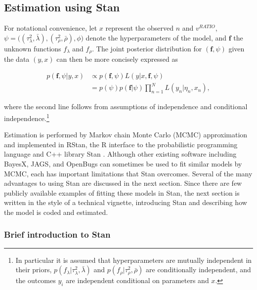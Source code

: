  \subsection{Estimation using Stan}

For notational convenience, let $x$ represent the observed $n$ and $v^{RATIO}$, 
$\psi = \big((\tau^2_\lambda, \bar{\lambda}), (\tau^2_\rho, \bar{\rho}), \phi \big)$ denote 
the hyperparameters of the model, and $\bm{f}$ the unknown functions  $f_\lambda$ and 
$f_\rho$. The joint posterior distribution for $(\bm{f}, \psi)$ given the data $(y, x)$ can then 
be more concisely expressed as 

\begin{align*}
p(\bm{f}, \psi | y, x) 
&\propto p(\bm{f}, \psi)  L(y | x, \bm{f}, \psi)  \\
&=p(\psi)  p(\bm{f} | \psi)   \prod_{n=1}^N L(y_n | \eta_n, x_n), 
\end{align*}

\noindent where the second line follows from assumptions of independence and conditional 
independence.\footnote{In particular it is assumed that hyperparameters are mutually independent 
in their priors, $p(f_\lambda | \tau^2_\lambda, \bar{\lambda})$ and $p(f_\rho | \tau^2_\rho, \bar{\rho})$ 
are conditionally independent, and the outcomes $y_i$ are independent conditional on parameters 
and $x$.}

Estimation is performed by Markov chain Monte Carlo (MCMC) approximation and implemented in 
RStan, the R interface to the probabilistic programming language and C++ library Stan 
. Although other existing software including BayesX, JAGS, and 
OpenBugs can sometimes be used to fit similar models by MCMC, each has important limitations 
that Stan overcomes. Several of the many advantages to using Stan are discussed in the next section. 
Since there are few publicly available examples of fitting these models in Stan, the next section is 
written in the style of a technical vignette, introducing Stan and describing how the model is coded 
and estimated. 

\subsubsection{Brief introduction to Stan}

